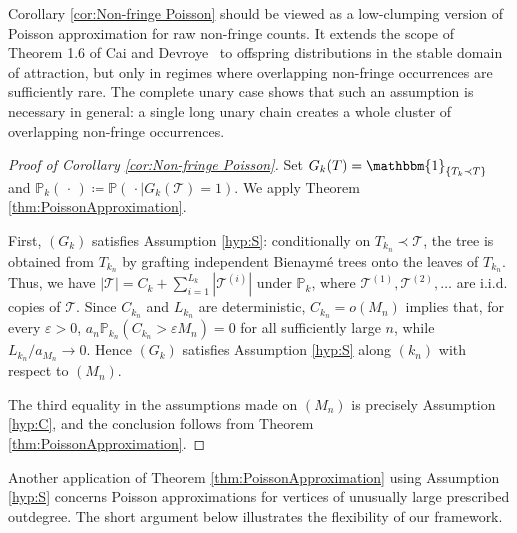 \documentclass[a4paper,11pt]{article}
\DeclareRobustCommand{\P}{\mathbb{P}}
\DeclareRobustCommand{\1}{\mathbf{1}}
\newcommand{\T}{\mathcal{T}}
\begin{document}
Corollary \ref{cor:Non-fringe Poisson} should be viewed as a low-clumping
version of Poisson approximation for raw non-fringe counts. It extends the
scope of Theorem 1.6 of Cai and Devroye~\cite{CD17} to offspring distributions
in the stable domain of attraction, but only in regimes where overlapping
non-fringe occurrences are sufficiently rare. The complete unary case shows
that such an assumption is necessary in general: a single long unary chain
creates a whole cluster of overlapping non-fringe occurrences.


\begin{proof}[Proof of Corollary \ref{cor:Non-fringe Poisson}]
Set $G_k(T)=\mathbbm{1}_{\{T_k\prec T\}}$ and $\P_k(\,\cdot\,)\coloneqq\P(\,\cdot\mid G_k(\mathcal T)=1)$. We apply Theorem \ref{thm:PoissonApproximation}.

First, $(G_k)$ satisfies Assumption \ref{hyp:S}: conditionally on $T_{k_n}\prec\mathcal T$, the tree is obtained from $T_{k_n}$ by grafting independent Bienaym\'e trees onto the leaves of $T_{k_n}$. Thus, we have $|\T| = C_{k} + \sum_{i=1}^{L_k}|\mathcal T^{(i)}|$ under $\P_k$, where $\mathcal T^{(1)},\mathcal T^{(2)},\dots$ are i.i.d. copies of $\T$. Since $C_{k_n}$ and $L_{k_n}$ are deterministic,
$C_{k_n}=o(M_n)$ implies that, for every $\varepsilon>0$,
$a_n\P_{k_n}(C_{k_n}>\varepsilon M_n)=0$ 
for all sufficiently large $n$, while
$L_{k_n}/a_{M_n}\to0$. Hence $(G_k)$ satisfies Assumption
\ref{hyp:S} along $(k_n)$ with respect to $(M_n)$.

The third equality in the assumptions made on $(M_{n})$ is precisely Assumption \ref{hyp:C}, and the conclusion follows from  Theorem
\ref{thm:PoissonApproximation}.
\end{proof}








Another application of Theorem \ref{thm:PoissonApproximation} using Assumption \ref{hyp:S} concerns
Poisson approximations for vertices of unusually large prescribed outdegree. The short argument below illustrates the flexibility of our framework.
\end{document}
